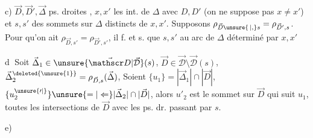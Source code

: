 c)  $\vec D,\vec D',\vec\Delta$ ps. droites , $x,x'$ les
int. de $\Delta$ avec $D,D'$ (on ne suppose pas $x\ne x'$)
et $s,s'$ des sommets sur $\Delta$ distincts de $x,x'$.
Supposons $\rho_{\vec D\unsure{\,|,}s}=\rho_{\vec D',s}$. Pour qu'on ait
$\rho_{\vec D,s'}=\rho_{\vec D',s'}$, il f. et s. que $s,s'$ 
au  arc de $\Delta$ déterminé par $x,x'$

\textcircled{d} Soit $\vec\Delta_1\in\unsure{\vec{\mathscr D}|\vec{\mathcal D}}(s)$, $\vec D\in\vec{\mathscr D}\setminus\vec{\mathscr D}(s)$, $\vec\Delta^{\deleted{\unsure{1}}}_2=\rho_{\vec D,s}(\vec\Delta)$,
Soient $\{u_1\}=|\vec\Delta_1|\cap|\vec D|$, $\{u^{\unsure{\prime|{}}}_2\}\unsure{=|\Leftarrow}|\vec\Delta_2|\cap|\vec D|$, alors $u'_2$ est le
sommet sur $\vec D$ qui suit $u_1$,  toutes les
intersections de $\vec D$ avec les ps. dr. passant par $s$.

e)
